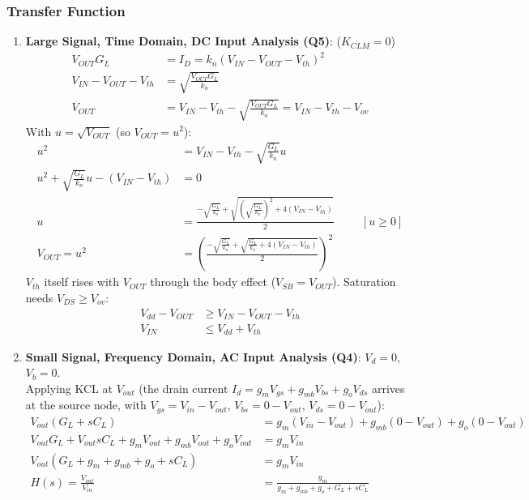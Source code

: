 \subsubsection{Transfer Function}
\begin{enumerate}
  \item \textbf{Large Signal, Time Domain, DC Input Analysis (Q5)}: (\(K_{CLM} = 0\))
    \begin{align*}
      V_{OUT} G_L &= I_D = k_n (V_{IN} - V_{OUT} - V_{th})^2 \\
      V_{IN} - V_{OUT} - V_{th} &= \sqrt{\frac{V_{OUT} G_L}{k_n}} \\
      V_{OUT} &= V_{IN} - V_{th} - \sqrt{\frac{V_{OUT} G_L}{k_n}} = V_{IN} - V_{th} - V_{ov}
    \end{align*}
    With \(u = \sqrt{V_{OUT}}\) (so \(V_{OUT} = u^2\)):
    \begin{align*}
      u^2 &= V_{IN} - V_{th} - \sqrt{\frac{G_L}{k_n}} u \\
      u^2 + \sqrt{\frac{G_L}{k_n}} u - (V_{IN} - V_{th}) &= 0 \\
      u &= \frac{-\sqrt{\frac{G_L}{k_n}} + \sqrt{\left(\sqrt{\frac{G_L}{k_n}}\right)^2 + 4(V_{IN} - V_{th})}}{2} \hspace{1cm} [u \geq 0] \\
      V_{OUT} = u^2 &= \left(\frac{-\sqrt{\frac{G_L}{k_n}} + \sqrt{\frac{G_L}{k_n} + 4(V_{IN} - V_{th})}}{2}\right)^2
    \end{align*}
    \(V_{th}\) itself rises with \(V_{OUT}\) through the body effect
    (\(V_{SB} = V_{OUT}\)). Saturation needs \(V_{DS} \geq V_{ov}\):
    \begin{align*}
      V_{dd} - V_{OUT} &\geq V_{IN} - V_{OUT} - V_{th} \\
      V_{IN} &\leq V_{dd} + V_{th}
    \end{align*}
  \item \textbf{Small Signal, Frequency Domain, AC Input Analysis (Q4)}: \(V_d = 0\), \(V_b = 0\).\\
    Applying KCL at \(V_{out}\) (the drain current
    \(I_d = g_m V_{gs} + g_{mb} V_{bs} + g_o V_{ds}\) arrives at the source node,
    with \(V_{gs} = V_{in} - V_{out}\), \(V_{bs} = 0 - V_{out}\), \(V_{ds} = 0 - V_{out}\)):
    \begin{align*}
      V_{out}(G_L + sC_L) &= g_m (V_{in} - V_{out}) + g_{mb}(0 - V_{out}) + g_o (0 - V_{out}) \\
      V_{out} G_L + V_{out} sC_L + g_m V_{out} + g_{mb} V_{out} + g_o V_{out} &= g_m V_{in} \\
      V_{out}(G_L + g_m + g_{mb} + g_o + sC_L) &= g_m V_{in} \\
      H(s) = \frac{V_{out}}{V_{in}} &= \frac{g_m}{g_m + g_{mb} + g_o + G_L + sC_L} \tag{1}
    \end{align*}
\end{enumerate}

